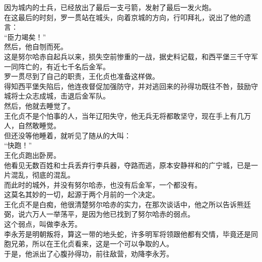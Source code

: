 \begin{multicols}{\theparacolNo}
因为城内的士兵，已经放出了最后一支弓箭，发射了最后一发火炮。\\

在这最后的时刻，罗一贯站在城头，向着京城的方向，行叩拜礼，说出了他的遗言：\\

“臣力竭矣！”\\

然后，他自刎而死。\\

这是努尔哈赤自起兵以来，损失空前惨重的一战，据史料记载，和西平堡三千守军一同阵亡的，有近七千名后金军。\\

罗一贯尽到了自己的职责，王化贞也准备这样做。\\

得知西平堡失陷后，他连夜督促加强防守，并对逃回来的孙得功既往不咎，鼓励守城将士众志成城，击退后金军队。\\

然后，他就去睡觉了。\\

王化贞不是个怕事的人，当年辽阳失守，他无兵无将都敢坚守，现在手上有几万人，自然敢睡觉。\\

但还没等他睡着，就听见了随从的大叫：\\

“快跑！”\\

王化贞跑出卧房。\\

他看见无数百姓和士兵丢弃行李兵器，夺路而逃，原本安静祥和的广宁城，已是一片混乱，彻底的混乱。\\

而此时的城外，并没有努尔哈赤，也没有后金军，一个都没有。\\

这莫名其妙的一切，起源于两个月前的一个决定。\\

王化贞不是白痴，他很清楚努尔哈赤的实力，在那次谈话中，他之所以告诉熊廷弼，说六万人一举荡平，是因为他已找到了努尔哈赤的弱点。\\

这个弱点，叫做李永芳。\\

李永芳是明朝叛将，算这一带的地头蛇，许多明军将领跟他都有交情，毕竟还是同胞兄弟，所以在王化贞看来，这是一个可以争取的人。\\

于是，他派出了心腹孙得功，前往敌营，劝降李永芳。\\


\end{multicols}
